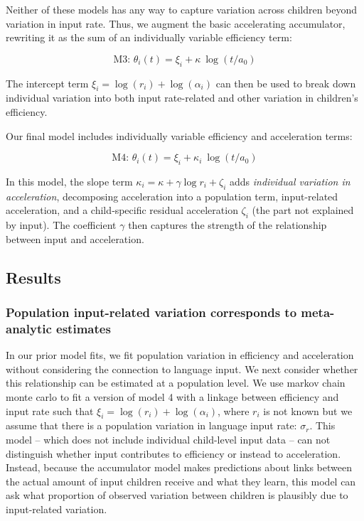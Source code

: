 \documentclass[
  11pt,
]{article}
\begin{document}
Neither of these models has any way to capture variation across children
beyond variation in input rate. Thus, we augment the basic accelerating
accumulator, rewriting it as the sum of an individually variable
efficiency term:

\[\text{M3: }\theta_i(t) = \xi_i + \kappa ~ \log(t/a_0)\]

The intercept term \(\xi_i = \log(r_i) + \log(\alpha_i)\) can then be
used to break down individual variation into both input rate-related and
other variation in children's efficiency.

Our final model includes individually variable efficiency and
acceleration terms:

\[\text{M4: }\theta_i(t) = \xi_i + \kappa_i ~ \log(t/a_0)\]

In this model, the slope term
\(\kappa_i = \kappa + \gamma \log r_i + \zeta_i\) adds \emph{individual
variation in acceleration}, decomposing acceleration into a population
term, input-related acceleration, and a child‑specific residual
acceleration \(\zeta_i\) (the part not explained by input). The
coefficient \(\gamma\) then captures the strength of the relationship
between input and acceleration.

\subsection{Results}\label{results-1}

\subsubsection{Population input-related variation corresponds to
meta-analytic
estimates}\label{population-input-related-variation-corresponds-to-meta-analytic-estimates}

In our prior model fits, we fit population variation in efficiency and
acceleration without considering the connection to language input. We
next consider whether this relationship can be estimated at a population
level. We use markov chain monte carlo to fit a version of model 4 with
a linkage between efficiency and input rate such that
\(\xi_i = \log(r_i) + \log(\alpha_i)\), where \(r_i\) is not known but
we assume that there is a population variation in language input rate:
\(\sigma_r\). This model -- which does not include individual
child-level input data -- can not distinguish whether input contributes
to efficiency or instead to acceleration. Instead, because the
accumulator model makes predictions about links between the actual
amount of input children receive and what they learn, this model can ask
what proportion of observed variation between children is plausibly due
to input-related variation.
\end{document}
